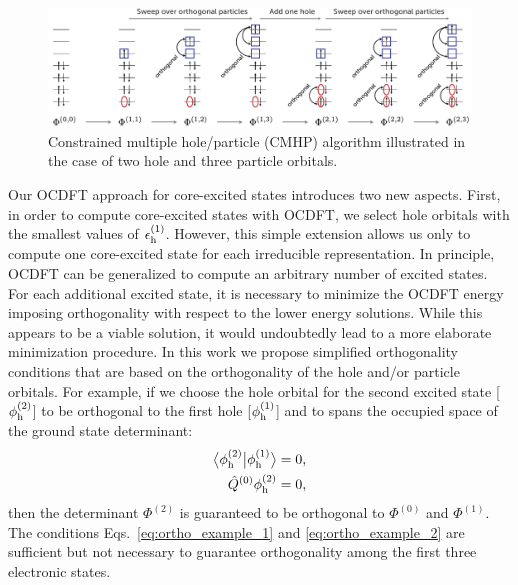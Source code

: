 \documentclass{article}
\begin{document}
\begin{figure}
\centering
\includegraphics[width=15.5cm]{Figure2NEW.pdf}
\caption{Constrained multiple hole/particle (CMHP) algorithm illustrated in the case of two hole and three particle orbitals.}
\label{fig:CMHP}
\end{figure}
Our OCDFT approach for core-excited states introduces two new aspects.
First, in order to compute core-excited states with OCDFT, we select hole orbitals with the smallest values of $\epsilon^{(1)}_{\rm h}$.
However, this simple extension allows us only to compute one core-excited state for each irreducible representation.
In principle, OCDFT can be generalized to compute an arbitrary number of excited states.  For each additional excited state, it is necessary to minimize the OCDFT energy imposing orthogonality with respect to the lower energy solutions.
While this appears to be a viable solution, it would undoubtedly lead to a more elaborate minimization procedure.
In this work we propose simplified orthogonality conditions that are based on the orthogonality of the hole and/or particle orbitals.
For example, if we choose the hole orbital for the second excited state [$\phi_{\rm h}^{(2)}$] to be orthogonal to the first hole [$\phi_{\rm h}^{(1)}$] and to spans the occupied space of the ground state determinant:
\begin{align}
\label{eq:ortho_example_1}
\braket[1]{\phi_{\rm h}^{(2)}}{\phi_{\rm h}^{(1)}} = 0,\\
\label{eq:ortho_example_2}
\hat{Q}^{(0)}\phi_{\rm h}^{(2)} = 0,
\end{align}
then the determinant $\Phi^{(2)}$ is guaranteed to be orthogonal to $\Phi^{(0)}$ and $\Phi^{(1)}$.
The conditions Eqs.~\eqref{eq:ortho_example_1} and \eqref{eq:ortho_example_2} are sufficient but not necessary to guarantee orthogonality among the first three electronic states. 
\end{document}
